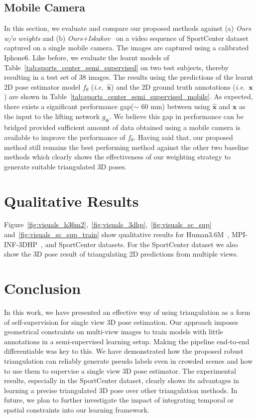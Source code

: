 \documentclass[runningheads]{llncs}
\def\Vec#1{{\boldsymbol{#1}}}
\def\Mat#1{{\boldsymbol{#1}}}
\newcommand{\bx}{\boldsymbol{x}}
\def\ie{\emph{i.e.}}
\begin{document}
\subsection{Mobile Camera}
In this section, we evaluate and compare our proposed methods against (a) \emph{Ours w/o weights} and
(b) {\it Ours+Iskakov}~\cite{Iskakov19} on a video sequence of SportCenter dataset captured on a single mobile camera. The images are captured using a calibrated Iphone6. Like before, we evaluate the learnt models of Table~\ref{tab:sports_center_semi_supervised} on two test subjects, thereby resulting in a test set of $38$ images. The results using the predictions of the learnt 2D pose estimator model $f_{\theta}$ (\ie~$\Vec{\hat x}$) and the 2D ground truth annotations (\ie~$\bx$) are shown in Table~\ref{tab:sports_center_semi_supervised_mobile}. As expected, there exists a significant performance gap($\sim$ 60 mm) between using $\Vec{\hat x}$ and $\bx$ as the input to the lifting network $g_{\Mat{\phi}}$. We believe this gap in performance can be bridged provided sufficient amount of data obtained using a mobile camera is available to improve the performance of $f_{\theta}$. Having said that, our proposed method still remains the best performing method against the other two baseline methods which clearly shows the effectiveness of our weighting strategy to generate suitable triangulated 3D poses.

 




\section*{Qualitative Results}
Figure~\ref{fig:visuals_h36m2},~\ref{fig:visuals_3dhp},~\ref{fig:visuals_sc_sup} and~\ref{fig:visuals_sc_sup_train} show qualitative results for Human3.6M~\cite{Ionescu14a},  MPI-INF-3DHP~\cite{Mehta17a}, and SportCenter datasets. For the SportCenter dataset we also show the 3D pose result of triangulating 2D predictions from multiple views.


%
 \section{Conclusion}
\label{sec:conclusion}

In this work, we have presented an effective way of using triangulation as a form of self-supervision for single view 3D pose estimation. Our approach imposes geometrical constraints on multi-view images to train models with little annotations in a semi-supervised learning setup. Making the pipeline end-to-end differentiable was key to this. We have demonstrated how the proposed robust triangulation can reliably generate pseudo labels even in crowded scenes and how to use them to supervise a single view 3D pose estimator. The experimental results, especially in the SportCenter dataset, clearly shows its advantages in learning a precise triangulated 3D pose over other triangulation methods. In future, we plan to further investigate the impact of integrating temporal or spatial constraints into our learning framework. 

\end{document}
